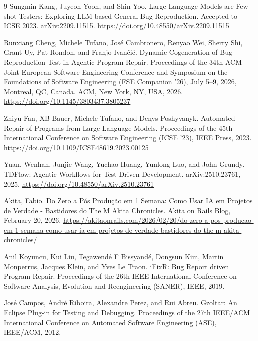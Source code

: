 \documentclass[12pt]{article}
\begin{document}
\begin{thebibliography}{9}
Sungmin Kang, Juyeon Yoon, and Shin Yoo.
\newblock Large Language Models are Few-shot Testers: Exploring LLM-based General Bug Reproduction.
\newblock Accepted to ICSE 2023. arXiv:2209.11515. \url{https://doi.org/10.48550/arXiv.2209.11515}

Runxiang Cheng, Michele Tufano, José Cambronero, Renyao Wei, Sherry Shi, Grant Uy, Pat Rondon, and Franjo Ivančić.
\newblock Dynamic Cogeneration of Bug Reproduction Test in Agentic Program Repair.
\newblock Proceedings of the 34th ACM Joint European Software Engineering Conference and Symposium on the Foundations of Software Engineering (FSE Companion '26), July 5--9, 2026, Montreal, QC, Canada. ACM, New York, NY, USA, 2026.
\newblock \url{https://doi.org/10.1145/3803437.3805237}

Zhiyu Fan, XB Bauer, Michele Tufano, and Denys Poshyvanyk.
\newblock Automated Repair of Programs from Large Language Models.
\newblock Proceedings of the 45th International Conference on Software Engineering (ICSE '23), IEEE Press, 2023.
\newblock \url{https://doi.org/10.1109/ICSE48619.2023.00125}

Yuan, Wenhan, Junjie Wang, Yuchao Huang, Yunlong Luo, and John Grundy.
\newblock TDFlow: Agentic Workflows for Test Driven Development.
\newblock arXiv:2510.23761, 2025.
\newblock \url{https://doi.org/10.48550/arXiv.2510.23761}

Akita, Fabio.
\newblock Do Zero a Pós Produção em 1 Semana: Como Usar IA em Projetos de Verdade - Bastidores do The M Akita Chronicles.
\newblock Akita on Rails Blog, February 20, 2026.
\newblock \url{https://akitaonrails.com/2026/02/20/do-zero-a-pos-producao-em-1-semana-como-usar-ia-em-projetos-de-verdade-bastidores-do-the-m-akita-chronicles/}

Anil Koyuncu, Kui Liu, Tegawendé F Bissyandé, Dongsun Kim, Martin Monperrus, Jacques Klein, and Yves Le Traon.
\newblock iFixR: Bug Report driven Program Repair.
\newblock Proceedings of the 26th IEEE International Conference on Software Analysis, Evolution and Reengineering (SANER), IEEE, 2019.

José Campos, André Riboira, Alexandre Perez, and Rui Abreu.
\newblock Gzoltar: An Eclipse Plug-in for Testing and Debugging.
\newblock Proceedings of the 27th IEEE/ACM International Conference on Automated Software Engineering (ASE), IEEE/ACM, 2012.

\end{thebibliography}
\endgroup
\end{document}
